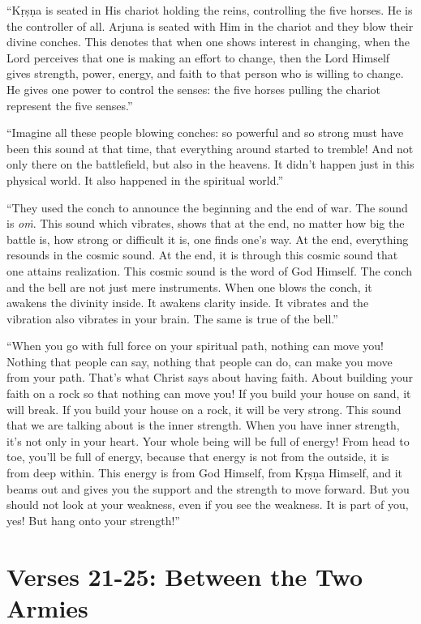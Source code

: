 \enquote{Kṛṣṇa is seated in His chariot holding the reins, controlling the five horses. He is the controller of all. Arjuna is seated with Him in the chariot and they blow their divine conches. This denotes that when one shows interest in changing, when the Lord perceives that one is making an effort to change, then the Lord Himself gives strength, power, energy, and faith to that person who is willing to change. He gives one power to control the senses: the five horses pulling the chariot represent the five senses.}

\enquote{Imagine all these people blowing conches: so powerful and so strong must have been this sound at that time, that everything around started to tremble! And not only there on the battlefield, but also in the heavens. It didn’t happen just in this physical world. It also happened in the spiritual world.}


\enquote{They used the conch to announce the beginning and the end of war. The sound is \textit{oṁ}. This sound which vibrates, shows that at the end, no matter how big the battle is, how strong or difficult it is, one finds one’s way. At the end, everything resounds in the cosmic sound. At the end, it is through this cosmic sound that one attains realization. This cosmic sound is the word of God Himself. The conch and the bell are not just mere instruments. When one blows the conch, it awakens the divinity inside. It awakens clarity inside. It vibrates and the vibration also vibrates in your brain. The same is true of the bell.}

\enquote{When you go with full force on your spiritual path, nothing can move you! Nothing that people can say, nothing that people can do, can make you move from your path. That’s what Christ says about having faith. About building your faith on a rock so that nothing can move you! If you build your house on sand, it will break. If you build your house on a rock, it will be very strong. This sound that we are talking about is the inner strength. When you have inner strength, it’s not only in your heart. Your whole being will be full of energy! From head to toe, you’ll be full of energy, because that energy is not from the outside, it is from deep within. This energy is from God Himself, from Kṛṣṇa Himself, and it beams out and gives you the support and the strength to move forward. But you should not look at your weakness, even if you see the weakness. It is part of you, yes! But hang onto your strength!}

\newpage
\section{Verses 21-25: Between the Two Armies}\label{sec-verses-21-25-between-the-two-armies}


